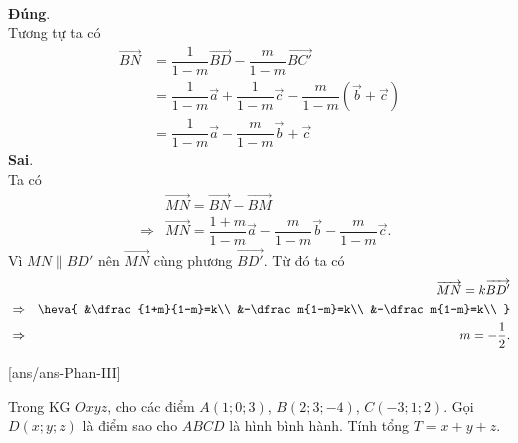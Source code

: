 \begin{ex}
{\begin{itemchoice}
\begin{eqnarray*}
 \end{eqnarray*}
 \itemch \textbf{Đúng}.\\
 Tương tự ta có
 \allowdisplaybreaks
 \begin{align*}
 \overrightarrow{BN}&=\dfrac1{1-m}\overrightarrow{BD}-\dfrac m{1-m}\overrightarrow{BC'}\\
 &=\dfrac1{1-m}\overrightarrow a+\dfrac1{1-m}\overrightarrow c-\dfrac m{1-m}(\overrightarrow b+\overrightarrow c)\\
 &=\dfrac1{1-m}\overrightarrow a-\dfrac m{1-m}\overrightarrow b+\overrightarrow c
 \end{align*}
 \itemch \textbf{Sai}.\\
 Ta có
 \allowdisplaybreaks
 \begin{eqnarray*}
 &&\overrightarrow{MN}=\overrightarrow{BN}-\overrightarrow{BM}\\
 &\Rightarrow&\overrightarrow{MN}=\dfrac{1+m}{1-m}\overrightarrow a-\dfrac m{1-m}\overrightarrow b-\dfrac m{1-m}\overrightarrow c.
 \end{eqnarray*}
 Vì $MN\parallel BD'$ nên $\overrightarrow{MN}$ cùng phương $\overrightarrow{BD'}$. Từ đó ta có
 \allowdisplaybreaks
 \begin{eqnarray*}
 &&\overrightarrow{MN}=k\overrightarrow{BD'}\\
 &\Rightarrow&\heva{
 &\dfrac{1+m}{1-m}=k\\
 &-\dfrac m{1-m}=k\\
 &-\dfrac m{1-m}=k\\
 }\\
 &\Rightarrow&m=-\dfrac12.
 \end{eqnarray*}
 \end{itemchoice}
}\end{ex}

\TNSA
{}[ans/ans\currfilebase-Phan-III]
\begin{ex}%
 Trong KG $Oxyz$, cho các điểm $A(1;0;3)$, $B(2;3;-4)$, $C(-3;1;2)$. Gọi $D(x;y;z)$ là điểm sao cho $ABCD$ là hình bình hành. Tính tổng $T=x+y+z$.
 \end{ex}

